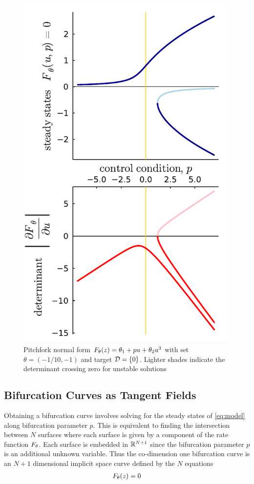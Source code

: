 \begin{figure}[H]
\centering{}
\captionsetup{justification=centering}
\includegraphics[width=11cm]{docs/figures/pitchfork}
\caption{Pitchfork normal form $F_{\theta}(z) = \theta_{1} + p u+\theta_{2}u^3$ with set $\theta=(-1/10,-1)$ and target $\mathcal{D}=\{0\}$. Lighter shades indicate the determinant crossing zero for unstable solutions}
\label{fig:pitchfork}
\end{figure}

\subsection{Bifurcation Curves as Tangent Fields}
Obtaining a bifurcation curve involves solving for the steady states of \eqref{eq:model} along bifurcation parameter $p$. This is equivalent to finding the intersection between $N$ surfaces where each surface is given by a component of the rate function $F_{\theta}$. Each surface is embedded in $\mathbb{R}^{N+1}$ since the bifurcation parameter $p$ is an additional unknown variable. Thus the co-dimension one bifurcation curve is an $N+1$ dimensional implicit space curve defined by the $N$ equations
\begin{align}
    F_{\theta}(z) = 0
\end{align}

